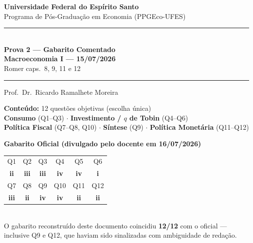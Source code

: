 \documentclass[12pt, a4paper]{article}
\begin{document}

\begin{titlepage}
\begin{center}
\vspace*{1.2cm}
{\Large\bfseries Universidade Federal do Espírito Santo}\\[0.5em]
{\large Programa de Pós-Graduação em Economia (PPGEco-UFES)}\\[2em]

\rule{\linewidth}{1.2pt}\\[0.8em]
{\LARGE\bfseries\color{cyanrbc} Prova 2 --- Gabarito Comentado\\[0.4em]
\large Macroeconomia I --- 15/07/2026}\\[0.4em]
{\normalsize\color{grayrbc} Romer caps.\ 8, 9, 11 e 12}\\[0.8em]
\rule{\linewidth}{1.2pt}

\vspace{1em}
{\large Prof.\ Dr.\ Ricardo Ramalhete Moreira}

\vspace{1.5em}
\begin{tcolorbox}[standard, colback=provabg, colframe=provaborder, width=0.88\textwidth,
  arc=4pt, boxrule=1.2pt, left=8pt, right=8pt, top=6pt, bottom=6pt]
\centering
\textbf{\textcolor{provaborder}{Conteúdo:}} 12 questões objetivas (escolha única)\\[0.4em]
\textbf{Consumo} (Q1--Q3) $\cdot$ \textbf{Investimento / $q$ de Tobin} (Q4--Q6)\\[0.2em]
\textbf{Política Fiscal} (Q7--Q8, Q10) $\cdot$ \textbf{Síntese} (Q9) $\cdot$
\textbf{Política Monetária} (Q11--Q12)
\end{tcolorbox}

\vspace{1.5em}
\begin{tcolorbox}[standard, colback=correctbg, colframe=correctborder,
  width=0.88\textwidth, arc=4pt, boxrule=1pt, left=8pt, right=8pt,
  top=6pt, bottom=6pt]
\centering
\textbf{\textcolor{correctborder}{Gabarito Oficial (divulgado pelo docente em 16/07/2026)}}\\[0.6em]
\begin{tabular}{cccccc}
\toprule
Q1 & Q2 & Q3 & Q4 & Q5 & Q6 \\
\textbf{ii} & \textbf{iii} & \textbf{iii} & \textbf{iv} & \textbf{iv} & \textbf{i} \\
\midrule
Q7 & Q8 & Q9 & Q10 & Q11 & Q12 \\
\textbf{iii} & \textbf{ii} & \textbf{iv} & \textbf{iv} & \textbf{ii} & \textbf{ii} \\
\bottomrule
\end{tabular}\\[0.5em]
{\footnotesize O gabarito reconstruído deste documento coincidiu
\textbf{12/12} com o oficial --- inclusive Q9 e Q12, que haviam sido
sinalizadas com ambiguidade de redação.}
\end{tcolorbox}


\end{center}
\end{titlepage}
\end{document}

